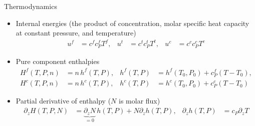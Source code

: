 \begin{frame}{Thermodynamics}
	\begin{scriptsize}
		\begin{itemize}
			\item Internal energies (the product of concentration, molar specific heat capacity at constant pressure, and temperature)
			\begin{align}
				u^f &= c^f c_P^f T^f, &
				u^t &= c^t c_P^t T^t, &
				u^c &= c^c c_P^c T^c
			\end{align}
			\item Pure component enthalpies
			\begin{subequations}
				\begin{align}
					H^f(T, P, n) &= n\, h^f(T, P), &
					h^f(T, P) &= h^f(T_0, P_0) + c_P^f (T - T_0), \\
					H^c(T, P, n) &= n\, h^c(T, P), &
					h^c(T, P) &= h^c(T_0, P_0) + c_P^c (T - T_0)
				\end{align}
			\end{subequations}
			\item Partial derivative of enthalpy ($N$ is molar flux)
			\begin{align}
				\partial_z H(T, P, N) &= \underbrace{\partial_z N}_{=0}\, h(T, P) + N \partial_z h(T, P), &
				\partial_z h(T, P) &= c_P \partial_z T
			\end{align}
		\end{itemize}
	\end{scriptsize}
\end{frame}